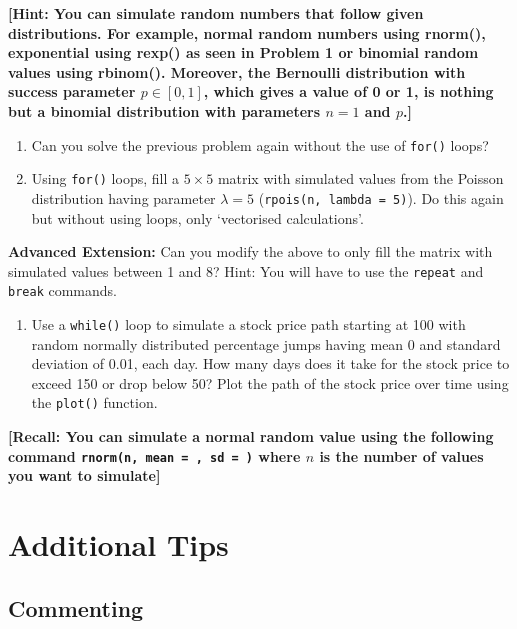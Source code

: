 \documentclass[
]{book}
\providecommand{\tightlist}{%
  \setlength{\itemsep}{0pt}\setlength{\parskip}{0pt}}
\theoremstyle{definition}
\theoremstyle{definition}
\theoremstyle{definition}
\theoremstyle{definition}
\theoremstyle{remark}
\begin{document}
\textbf{{[}Hint: You can simulate random numbers that follow given distributions. For example, normal random numbers using rnorm(), exponential using rexp() as seen in Problem 1 or binomial random values using rbinom(). Moreover, the Bernoulli distribution with success parameter \(p \in [0,1]\), which gives a value of 0 or 1, is nothing but a binomial distribution with parameters \(n =1\) and \(p\).{]}}

\begin{enumerate}
\def\labelenumi{\arabic{enumi}.}
\setcounter{enumi}{7}
\item
  Can you solve the previous problem again without the use of \texttt{for()} loops?
\item
  Using \texttt{for()} loops, fill a \(5 \times 5\) matrix with simulated values from the Poisson distribution having parameter \(\lambda = 5\) (\texttt{rpois(n,\ lambda\ =\ 5)}). Do this again but without using loops, only `vectorised calculations'.
\end{enumerate}

\textbf{Advanced Extension:} Can you modify the above to only fill the matrix with simulated values between 1 and 8? Hint: You will have to use the \texttt{repeat} and \texttt{break} commands.

\begin{enumerate}
\def\labelenumi{\arabic{enumi}.}
\setcounter{enumi}{9}
\tightlist
\item
  Use a \texttt{while()} loop to simulate a stock price path starting at 100 with random normally distributed percentage jumps having mean 0 and standard deviation of 0.01, each day. How many days does it take for the stock price to exceed 150 or drop below 50? Plot the path of the stock price over time using the \texttt{plot()} function.
\end{enumerate}

\textbf{{[}Recall: You can simulate a normal random value using the following command \texttt{rnorm(n,\ mean\ =\ ,\ sd\ =\ )} where \(n\) is the number of values you want to simulate{]}}

\hypertarget{appendix-appendix}{%
\appendix}


\hypertarget{additional-tips}{%
\chapter{Additional Tips}\label{additional-tips}}

\hypertarget{commenting}{%
\section*{Commenting}\label{commenting}}
\end{document}

